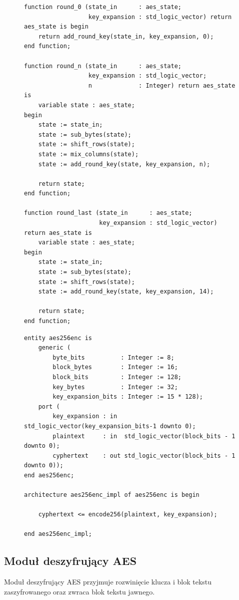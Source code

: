 \begin{figure}[!p]
\begin{lstlisting}[style=vhdl, captionpos=b, caption={Implementacja rund szyfrowania}, label={lst:rounds}]
function round_0 (state_in      : aes_state; 
                  key_expansion : std_logic_vector) return aes_state is begin
	return add_round_key(state_in, key_expansion, 0);
end function;

function round_n (state_in      : aes_state; 
                  key_expansion : std_logic_vector;
                  n             : Integer) return aes_state is
	variable state : aes_state;
begin
	state := state_in;
	state := sub_bytes(state);
	state := shift_rows(state);
	state := mix_columns(state);
	state := add_round_key(state, key_expansion, n);

	return state;
end function;

function round_last (state_in      : aes_state; 
                     key_expansion : std_logic_vector) return aes_state is
	variable state : aes_state;
begin
	state := state_in;
	state := sub_bytes(state);
	state := shift_rows(state);
	state := add_round_key(state, key_expansion, 14);

	return state;
end function;
\end{lstlisting}
\end{figure}

\begin{figure}[!p]
\begin{lstlisting}[style=vhdl, captionpos=b, caption={\textit{aes256enc} -- interfejs i implementacja modułu szyfrującego AES}, label={lst:aes-encryption-module}]
entity aes256enc is
	generic (
		byte_bits          : Integer := 8;
		block_bytes        : Integer := 16;
		block_bits         : Integer := 128;
		key_bytes          : Integer := 32;
		key_expansion_bits : Integer := 15 * 128);
	port (
		key_expansion : in  std_logic_vector(key_expansion_bits-1 downto 0);
		plaintext     : in  std_logic_vector(block_bits - 1 downto 0);
		cyphertext    : out std_logic_vector(block_bits - 1 downto 0));
end aes256enc;

architecture aes256enc_impl of aes256enc is begin

	cyphertext <= encode256(plaintext, key_expansion);

end aes256enc_impl;
\end{lstlisting}
\end{figure}




\newpage
\subsection{Moduł deszyfrujący AES}
Moduł deszyfrujący AES przyjmuje rozwinięcie klucza i blok tekstu zaszyfrowanego oraz zwraca blok tekstu jawnego.

